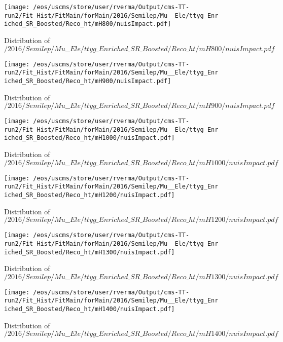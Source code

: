 \begin{figure}
\centering
\texttt{[image: /eos/uscms/store/user/rverma/Output/cms-TT-run2/Fit\_Hist/FitMain/forMain/2016/Semilep/Mu\_\_Ele/ttyg\_Enriched\_SR\_Boosted/Reco\_ht/mH800/nuisImpact.pdf]}
\caption{Distribution of $/2016/Semilep/Mu\_\_Ele/ttyg\_Enriched\_SR\_Boosted/Reco\_ht/mH800/nuisImpact.pdf$}
\end{figure}

\begin{figure}
\centering
\texttt{[image: /eos/uscms/store/user/rverma/Output/cms-TT-run2/Fit\_Hist/FitMain/forMain/2016/Semilep/Mu\_\_Ele/ttyg\_Enriched\_SR\_Boosted/Reco\_ht/mH900/nuisImpact.pdf]}
\caption{Distribution of $/2016/Semilep/Mu\_\_Ele/ttyg\_Enriched\_SR\_Boosted/Reco\_ht/mH900/nuisImpact.pdf$}
\end{figure}

\begin{figure}
\centering
\texttt{[image: /eos/uscms/store/user/rverma/Output/cms-TT-run2/Fit\_Hist/FitMain/forMain/2016/Semilep/Mu\_\_Ele/ttyg\_Enriched\_SR\_Boosted/Reco\_ht/mH1000/nuisImpact.pdf]}
\caption{Distribution of $/2016/Semilep/Mu\_\_Ele/ttyg\_Enriched\_SR\_Boosted/Reco\_ht/mH1000/nuisImpact.pdf$}
\end{figure}

\begin{figure}
\centering
\texttt{[image: /eos/uscms/store/user/rverma/Output/cms-TT-run2/Fit\_Hist/FitMain/forMain/2016/Semilep/Mu\_\_Ele/ttyg\_Enriched\_SR\_Boosted/Reco\_ht/mH1200/nuisImpact.pdf]}
\caption{Distribution of $/2016/Semilep/Mu\_\_Ele/ttyg\_Enriched\_SR\_Boosted/Reco\_ht/mH1200/nuisImpact.pdf$}
\end{figure}

\begin{figure}
\centering
\texttt{[image: /eos/uscms/store/user/rverma/Output/cms-TT-run2/Fit\_Hist/FitMain/forMain/2016/Semilep/Mu\_\_Ele/ttyg\_Enriched\_SR\_Boosted/Reco\_ht/mH1300/nuisImpact.pdf]}
\caption{Distribution of $/2016/Semilep/Mu\_\_Ele/ttyg\_Enriched\_SR\_Boosted/Reco\_ht/mH1300/nuisImpact.pdf$}
\end{figure}

\begin{figure}
\centering
\texttt{[image: /eos/uscms/store/user/rverma/Output/cms-TT-run2/Fit\_Hist/FitMain/forMain/2016/Semilep/Mu\_\_Ele/ttyg\_Enriched\_SR\_Boosted/Reco\_ht/mH1400/nuisImpact.pdf]}
\caption{Distribution of $/2016/Semilep/Mu\_\_Ele/ttyg\_Enriched\_SR\_Boosted/Reco\_ht/mH1400/nuisImpact.pdf$}
\end{figure}


